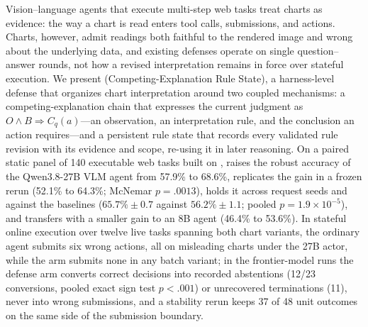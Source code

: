 Vision--language agents that execute multi-step web
tasks treat charts as evidence: the way a chart is read
enters tool calls, submissions, and actions.
Charts, however, admit readings both faithful to the
rendered image and wrong about the underlying data, and
existing defenses operate on single
question--answer rounds, not how a revised
interpretation remains in force over stateful
execution.
We present \ours{} (Competing-Explanation Rule State), a
harness-level defense that organizes chart
interpretation around two coupled mechanisms: a
competing-explanation chain that expresses the current
judgment as $O\land B\Rightarrow C_q(a)$---an observation,
an interpretation rule, and the conclusion an action
requires---and a persistent rule state that records
every validated rule revision with its evidence and
scope, re-using it in later reasoning.
On a paired static panel of 140 executable web tasks
built on \bench, \ours{} raises the robust accuracy of
the Qwen3.8-27B VLM agent from 57.9\% to
68.6\%,
replicates the gain in a frozen rerun (52.1\% to
64.3\%; McNemar $p=.0013$), holds it across request seeds and against the baselines ($65.7\%\pm0.7$
against $56.2\%\pm1.1$;
pooled $p=1.9\times10^{-5}$), and transfers with a
smaller gain to an 8B agent (46.4\% to 53.6\%).
In stateful online execution over twelve live tasks
spanning both chart variants, the
ordinary agent submits six wrong actions, all on
misleading charts under the 27B actor, while the
\ours{} arm submits none in any batch
variant; in the frontier-model runs the defense arm
converts correct decisions into recorded abstentions
(12/23 conversions, pooled exact sign test $p<.001$)
or unrecovered terminations (11), never into wrong
submissions, and a stability rerun keeps 37 of 48 unit
outcomes on the same side of the submission boundary.

